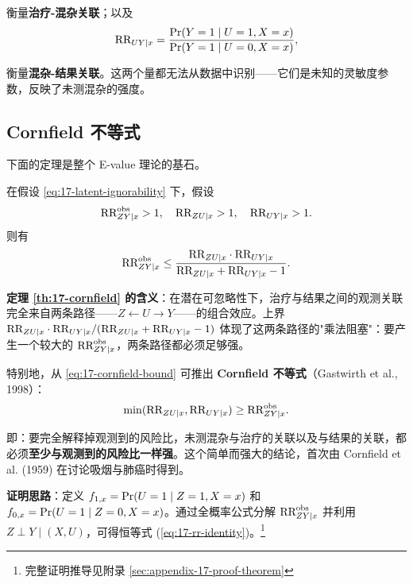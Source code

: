 衡量\textbf{治疗-混杂关联}；以及
\begin{equation}
\text{RR}_{UY\mid x} = \frac{\operatorname{Pr}(Y=1 \mid U=1, X=x)}{\operatorname{Pr}(Y=1 \mid U=0, X=x)} ,
\label{eq:17-sensitivity-uy}
\end{equation}

衡量\textbf{混杂-结果关联}。这两个量都无法从数据中识别——它们是未知的灵敏度参数，反映了未测混杂的强度。

\subsection{Cornfield 不等式}\label{sec:17-cornfield-inequality}

下面的定理是整个 E-value 理论的基石。

\begin{Theorem}\label{th:17-cornfield}
在假设 \cref{eq:17-latent-ignorability} 下，假设
\begin{equation}
\text{RR}_{ZY\mid x}^{\mathrm{obs}} > 1, \quad \text{RR}_{ZU\mid x} > 1, \quad \text{RR}_{UY\mid x} > 1 .
\label{eq:17-assumptions}
\end{equation}
则有
\begin{equation}
\text{RR}_{ZY\mid x}^{\mathrm{obs}} \leq \frac{\text{RR}_{ZU\mid x} \cdot \text{RR}_{UY\mid x}}{\text{RR}_{ZU\mid x} + \text{RR}_{UY\mid x} - 1} .
\label{eq:17-cornfield-bound}
\end{equation}
\end{Theorem}

\textbf{定理 \ref{th:17-cornfield} 的含义}：在潜在可忽略性下，治疗与结果之间的观测关联完全来自两条路径——$Z \leftarrow U \rightarrow Y$——的组合效应。上界 $\text{RR}_{ZU\mid x} \cdot \text{RR}_{UY\mid x} / (\text{RR}_{ZU\mid x} + \text{RR}_{UY\mid x} - 1)$ 体现了这两条路径的"乘法阻塞"：要产生一个较大的 $\text{RR}_{ZY\mid x}^{\mathrm{obs}}$，两条路径都必须足够强。

特别地，从 \cref{eq:17-cornfield-bound} 可推出 \textbf{Cornfield 不等式}（Gastwirth et al., 1998）：
\begin{equation}
\min(\text{RR}_{ZU\mid x}, \text{RR}_{UY\mid x}) \geq \text{RR}_{ZY\mid x}^{\mathrm{obs}} .
\label{eq:17-cornfield-inequality}
\end{equation}

即：要完全解释掉观测到的风险比，未测混杂与治疗的关联以及与结果的关联，都必须\textbf{至少与观测到的风险比一样强}。这个简单而强大的结论，首次由 Cornfield et al. (1959) 在讨论吸烟与肺癌时得到。

\textbf{证明思路}：定义 $f_{1,x} = \operatorname{Pr}(U=1 \mid Z=1, X=x)$ 和 $f_{0,x} = \operatorname{Pr}(U=1 \mid Z=0, X=x)$。通过全概率公式分解 $\text{RR}_{ZY\mid x}^{\mathrm{obs}}$ 并利用 $Z \perp Y \mid (X,U)$，可得恒等式 (\ref{eq:17-rr-identity})。\footnote{完整证明推导见附录 \cref{sec:appendix-17-proof-theorem}}

